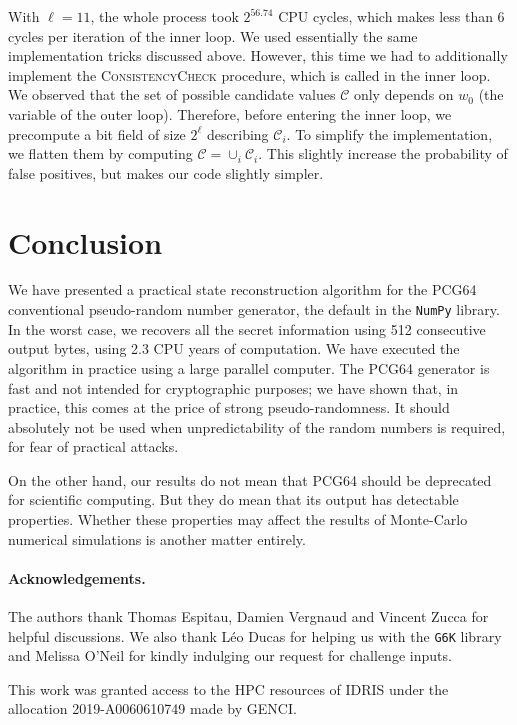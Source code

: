 \documentclass[journal=tosc,final]{iacrtrans}
\begin{document}
With $\ell=11$, the whole process took $2^{56.74}$ CPU cycles, which makes less
than 6 cycles per iteration of the inner loop. We used essentially the same
implementation tricks discussed above. However, this time we had to additionally
implement the \textsc{ConsistencyCheck} procedure, which is called in the inner
loop. We observed that the set of possible candidate values $\mathcal{C}$ only
depends on $w_0$ (the variable of the outer loop). Therefore, before entering
the inner loop, we precompute a bit field of size $2^\ell$ describing
$\mathcal{C}_i$. To simplify the implementation, we flatten them by computing
$\mathcal{C} = \cup_i \mathcal{C}_i$. This slightly increase the probability of
false positives, but makes our code slightly simpler.

\section{Conclusion}

We have presented a practical state reconstruction algorithm for the
\textsf{PCG64} conventional pseudo-random number generator, the default in the
\texttt{NumPy} library. In the worst case, we recovers all the secret
information using 512 consecutive output bytes, using 2.3 CPU years of
computation. We have executed the algorithm in practice using a large parallel
computer. The \textsf{PCG64} generator is fast and not intended for
cryptographic purposes; we have shown that, in practice, this comes at the price
of strong pseudo-randomness. It should absolutely not be used when
unpredictability of the random numbers is required, for fear of practical
attacks.

On the other hand, our results do not mean that \textsf{PCG64} should be
deprecated for scientific computing. But they do mean that its output has
detectable properties. Whether these properties may affect the results of
Monte-Carlo numerical simulations is another matter entirely.

\paragraph{Acknowledgements.} The authors thank Thomas Espitau, Damien Vergnaud
and Vincent Zucca for helpful discussions. We also thank Léo Ducas for helping
us with the \texttt{G6K} library and Melissa O'Neil for kindly indulging our
request for challenge inputs.

This work was granted access to the HPC resources of IDRIS under the allocation
2019-A0060610749 made by GENCI.



\end{document}

